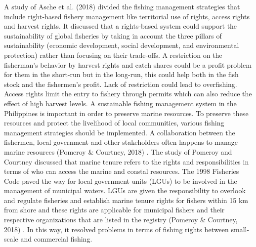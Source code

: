 A study of Asche et al. (2018) \nocite{rrl-FRP1} divided the fishing management strategies that include right-based fishery management like territorial use of rights, access rights and harvest rights. It discussed that a rights-based system could support the sustainability of global fisheries by taking in account the three pillars of sustainability (economic development, social development, and environmental protection) rather than focusing on their trade-offs. A restriction on the fisherman’s behavior by harvest rights and catch shares could be a profit problem for them in the short-run but in the long-run, this could help both in the fish stock and the fishermen’s profit. Lack of restriction could lead to overfishing. Access rights limit the entry to fishery through permits which can also reduce the effect of high harvest levels. A sustainable fishing management system in the Philippines is important in order to preserve marine resources. To preserve these resources and protect the livelihood of local communities, various fishing management strategies should be implemented. A collaboration between the fishermen, local government and other stakeholders often happens to manage marine resources (Pomeroy \& Courtney, 2018) \nocite{rrl-FRP2}. The study of Pomeroy and Courtney discussed that marine tenure refers to the rights and responsibilities in terms of who can access the marine and coastal resources. The 1998 Fisheries Code paved the way for local government units (LGUs) to be involved in the management of municipal waters. LGUs are given the responsibility to overlook and regulate fisheries and establish marine tenure rights for fishers within 15 km from shore  and these rights are applicable for municipal fishers and their respective organizations that are listed in the registry (Pomeroy \& Courtney, 2018) \nocite{rrl-FRP2}. In this way, it resolved problems in terms of fishing rights between small-scale and commercial fishing.

